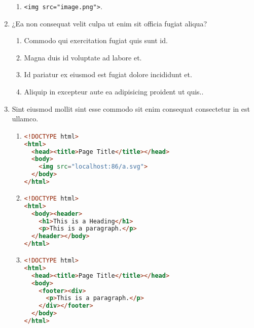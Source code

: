 \documentclass[a4paper,12pt]{article}
\begin{document}
\begin{enumerate}[label=\textbf{\arabic*.}]
\begin{enumerate}
		\item  \texttt{<img src="{}image.png"{}>}.
    
	\end{enumerate}

\item ¿Ea non consequat velit culpa ut enim sit officia fugiat aliqua?
\begin{multicols}{2}
	\begin{enumerate}
		\item  Commodo qui exercitation fugiat quis sunt id.
    
		\item  Magna duis id voluptate ad labore et.
  
		\item  Id pariatur ex eiusmod est fugiat dolore incididunt et.
    
		\item  Aliquip in excepteur aute ea adipisicing proident ut quis..
    
	\end{enumerate}

\end{multicols}
\item Sint eiusmod mollit sint esse commodo sit enim consequat consectetur in est ullamco.
	\begin{enumerate}
		\item  \hfill \vspace*{-7mm}
    \begin{lstlisting}[language=HTML]
<!DOCTYPE html>
<html>
  <head><title>Page Title</title></head>
  <body>
    <img src="localhost:86/a.svg">
  </body>
</html>
    \end{lstlisting}
    
		\item  \hfill \vspace*{-7mm}
    \begin{lstlisting}[language=HTML]
<!DOCTYPE html> 
<html>
  <body><header>
    <h1>This is a Heading</h1>
    <p>This is a paragraph.</p>
  </header></body>
</html>
    \end{lstlisting}
    
		\item  \hfill \vspace*{-7mm}
    \begin{lstlisting}[language=HTML]
<!DOCTYPE html>
<html>
  <head><title>Page Title</title></head>
  <body>
    <footer><div>
      <p>This is a paragraph.</p>
    </div></footer>
  </body>
</html>
    \end{lstlisting}
  

\end{enumerate}
\end{enumerate}
\end{document}
